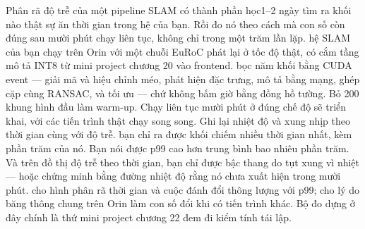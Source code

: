 \documentclass[../../deep_learning.tex]{subfiles}
\begin{document}
\begin{ungdung}
\end{ungdung}

\begin{duan}{Phân rã độ trễ của một pipeline SLAM có thành phần học}{1--2 ngày}
\dmt tìm ra khối nào thật sự ăn thời gian trong hệ của bạn. Rồi đo nó theo cách mà con số còn đúng sau mười phút chạy liên tục, không chỉ trong một trăm lần lặp.
\ddl hệ SLAM của bạn chạy trên Orin với một chuỗi EuRoC phát lại ở tốc độ thật, có cắm tầng mô tả INT8 từ mini project chương 20 vào frontend.
\dbc bọc năm khối bằng CUDA event --- giải mã và hiệu chỉnh méo, phát hiện đặc trưng, mô tả bằng mạng, ghép cặp cùng RANSAC, và tối ưu --- chứ không bấm giờ bằng đồng hồ tường. Bỏ 200 khung hình đầu làm warm-up. Chạy liên tục mười phút ở đúng chế độ  sẽ triển khai, với các tiến trình thật chạy song song. Ghi lại nhiệt độ và xung nhịp theo thời gian cùng với độ trễ.
\dxk bạn chỉ ra được khối chiếm nhiều thời gian nhất, kèm phần trăm của nó. Bạn nói được p99 cao hơn trung bình bao nhiêu phần trăm. Và trên đồ thị độ trễ theo thời gian, bạn chỉ được bậc thang do tụt xung vì nhiệt --- hoặc chứng minh bằng đường nhiệt độ rằng nó chưa xuất hiện trong mười phút.
\dnv {} cho hình phân rã thời gian và cuộc đánh đổi thông lượng với p99;  cho lý do băng thông chung trên Orin làm con số đổi khi có tiến trình khác. Bộ đo dựng ở đây chính là thứ mini project chương 22 đem đi kiểm tính tái lập.
\end{duan}
\end{document}
